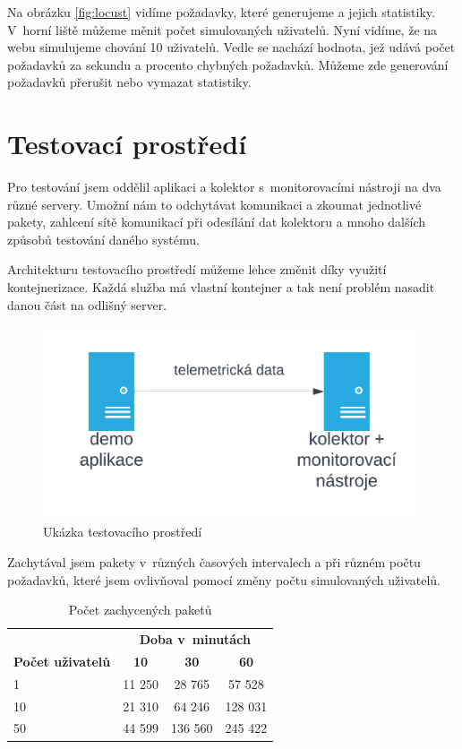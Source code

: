 Na obrázku \ref{fig:locust} vidíme požadavky, které generujeme a jejich statistiky. V~horní liště můžeme měnit počet simulovaných uživatelů. Nyní vidíme, že na webu simulujeme chování 10 uživatelů. Vedle se nachází hodnota, jež udává počet požadavků za sekundu a procento chybných požadavků. Můžeme zde generování požadavků přerušit nebo vymazat statistiky.

\section{Testovací prostředí}
Pro testování jsem oddělil aplikaci a kolektor s~monitorovacími nástroji na dva různé servery. Umožní nám to odchytávat komunikaci a zkoumat jednotlivé pakety, zahlcení sítě komunikací při odesílání dat kolektoru a mnoho dalších způsobů testování daného systému.

Architekturu testovacího prostředí můžeme lehce změnit díky využití kontejnerizace. Každá služba má vlastní kontejner a tak není problém nasadit danou část na odlišný server.

\begin{figure}[H]
  \centering
  \includegraphics[width=11cm]{obrazky-figures/architectureServers.png}
  \caption{Ukázka testovacího prostředí}
  \label{fig:serverArchitecture}
\end{figure}

Zachytával jsem pakety v~různých časových intervalech a při různém počtu požadavků, které jsem ovlivňoval pomocí změny počtu simulovaných uživatelů.

\begin{table}[H]
  \centering
   \begin{tabular}{|l|c|c|c|}
     \hline
      & \multicolumn{3}{c|}{\bfseries Doba v~minutách} \\
     \cline{2-4}
     \bfseries Počet uživatelů & \bfseries 10 & \bfseries 30 & \bfseries 60\\
     \hline
     1 & 11 250 & 28 765 & 57 528\\
     10 & 21 310 & 64 246 & 128 031\\
     50 & 44 599 & 136 560 & 245 422\\
     \hline
    \end{tabular}
    \caption{Počet zachycených paketů}
    \label{tab:pakety}
\end{table}

